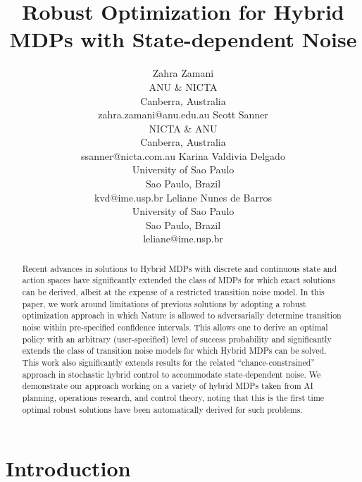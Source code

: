 \documentclass{article}
\title{	Robust Optimization for Hybrid MDPs with State-dependent Noise }
\author{Zahra Zamani\\
ANU \& NICTA\\
Canberra, Australia\\
zahra.zamani@anu.edu.au
\And
Scott Sanner\\
NICTA \& ANU\\
Canberra, Australia\\
ssanner@nicta.com.au
\And
Karina Valdivia Delgado\\
University of Sao Paulo\\
Sao Paulo, Brazil\\
kvd@ime.usp.br
\And
Leliane Nunes de Barros\\
University of Sao Paulo\\
Sao Paulo, Brazil\\
leliane@ime.usp.br}
\begin{document}
\maketitle

\begin{abstract}
Recent advances in solutions to Hybrid MDPs with discrete and
continuous state and action spaces have significantly extended the
class of MDPs for which exact solutions can be derived, albeit at the
expense of a restricted transition noise model.  In this paper, we
work around limitations of previous solutions by adopting a robust
optimization approach in which Nature is allowed to adversarially
determine transition noise within pre-specified confidence
intervals.  This allows one to derive an optimal policy with an
arbitrary (user-specified) level of success probability and
significantly extends the class of transition noise models for which
Hybrid MDPs can be solved.  This work also significantly extends
results for the related ``chance-constrained'' approach in stochastic
hybrid control to accommodate state-dependent noise.  We demonstrate
our approach working on a variety of hybrid MDPs taken from AI
planning, operations research, and control theory, noting that this is
the first time optimal robust solutions have been automatically
derived for such problems.
\end{abstract}

\section{Introduction}
\end{document}
